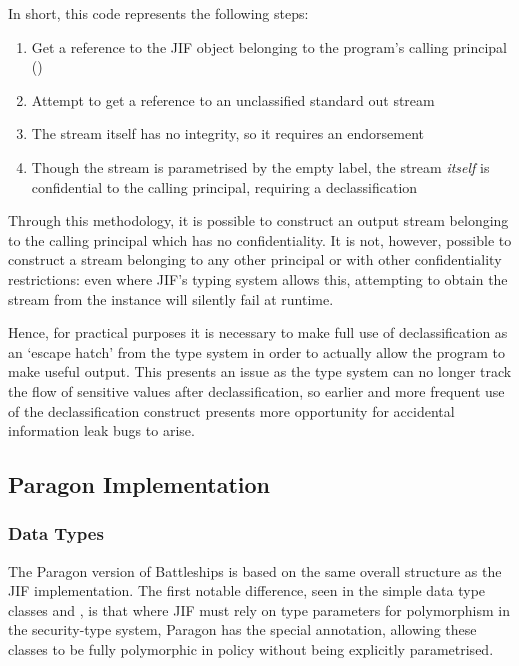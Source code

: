 In short, this code represents the following steps:

\begin{enumerate}
	\item Get a reference to the JIF  object belonging to the program's calling principal ()
	
	\item Attempt to get a reference to an unclassified standard out stream
	
	\item The stream itself has no integrity, so it requires an endorsement
	
	\item Though the stream is parametrised by the empty label, the stream \textit{itself} is confidential to the calling principal, requiring a declassification
\end{enumerate}

Through this methodology, it is possible to construct an output stream belonging to the calling principal which has no confidentiality. It is not, however, possible to construct a stream belonging to any other principal or with other confidentiality restrictions: even where JIF's typing system allows this, attempting to obtain the stream from the  instance will silently fail at runtime.

Hence, for practical purposes it is necessary to make full use of declassification as an `escape hatch' from the type system in order to actually allow the program to make useful output. This presents an issue as the type system can no longer track the flow of sensitive values after declassification, so earlier and more frequent use of the declassification construct presents more opportunity for accidental information leak bugs to arise.

\newpage

\subsection{Paragon Implementation}

\subsubsection{Data Types}

The Paragon version of Battleships is based on the same overall structure as the JIF implementation. The first notable difference, seen in the simple data type classes  and , is that where JIF must rely on type parameters for polymorphism in the security-type system, Paragon has the special  annotation, allowing these classes to be fully polymorphic in policy without being explicitly parametrised.

